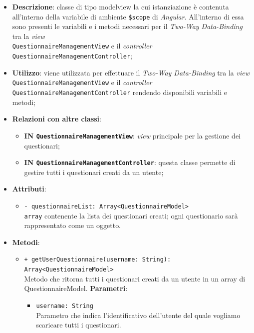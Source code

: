 	\begin{itemize}
		\item \textbf{Descrizione}: classe di tipo modelview la cui istanziazione è contenuta all'interno della variabile di ambiente \texttt{\$scope} di \textit{Angular}. All'interno di essa sono presenti le variabili e i metodi necessari per il \textit{Two-Way Data-Binding} tra la \textit{view} \\\texttt{QuestionnaireManagementView} e il \textit{controller} \texttt{QuestionnaireManagementController};
		\item \textbf{Utilizzo}: viene utilizzata per effettuare il \textit{Two-Way Data-Binding} tra la \textit{view} \texttt{QuestionnaireManagementView} e il \textit{controller} \texttt{QuestionnaireManagementController} rendendo disponibili variabili e metodi;
		\item \textbf{Relazioni con altre classi}: 
		\begin{itemize}
			\item \textbf{IN \texttt{QuestionnaireManagementView}}: \textit{view} principale per la gestione dei questionari; 
			\item \textbf{IN \texttt{QuestionnaireManagementController}}: questa classe permette di gestire tutti i questionari creati da un utente;
		\end{itemize}
		\item \textbf{Attributi}: 
		\begin{itemize}
			\item \texttt{- questionnaireList: Array<QuestionnaireModel>} \\ \texttt{array} contenente la lista dei questionari creati; ogni questionario sarà rappresentato come un oggetto.
		\end{itemize}
		\item \textbf{Metodi}:
		\begin{itemize}
				\item \texttt{+ getUserQuestionnaire(username: String): Array<QuestionnaireModel>} \\Metodo che ritorna tutti i questionari creati da un utente in un array di QuestionnaireModel.
				\textbf{Parametri}:
				\begin{itemize}
					\item \texttt{username: String}\\ 
					Parametro che indica l'identificativo dell'utente del quale vogliamo scaricare tutti i questionari.
				\end{itemize}
		\end{itemize} 
	\end{itemize}
	
	